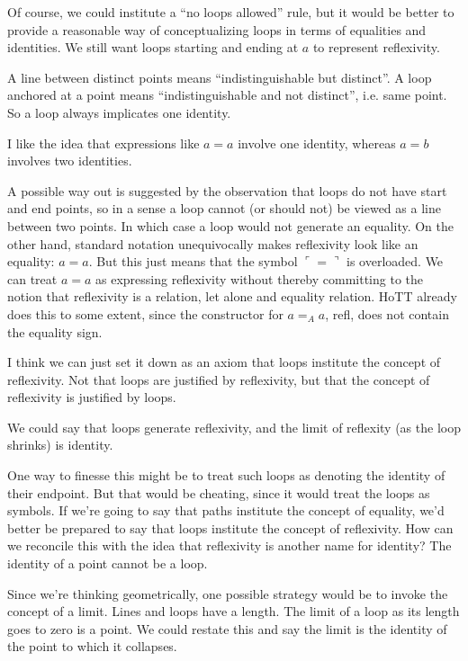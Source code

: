 Of course, we could institute a ``no loops allowed'' rule, but it
would be better to provide a reasonable way of conceptualizing loops
in terms of equalities and identities. We still want loops starting
and ending at \(a\) to represent reflexivity.

A line between distinct points means ``indistinguishable but
distinct''. A loop anchored at a point means ``indistinguishable and
not distinct'', i.e. same point. So a loop always implicates one
identity.

I like the idea that expressions like \(a=a\) involve one identity,
whereas \(a=b\) involves two identities.

A possible way out is suggested by the observation that loops do not
have start and end points, so in a sense a loop cannot (or should not)
be viewed as a line between two points. In which case a loop would not
generate an equality. On the other hand, standard notation
unequivocally makes reflexivity look like an equality: \(a=a\). But
this just means that the symbol \(\ulcorner = \urcorner\) is
overloaded. We can treat \(a=a\) as expressing reflexivity without
thereby committing to the notion that reflexivity is a relation, let
alone and equality relation. HoTT already does this to some extent,
since the constructor for \(a=_A a\), \textsf{refl}, does not contain
the equality sign.

I think we can just set it down as an axiom that loops institute the
concept of reflexivity. Not that loops are justified by reflexivity,
but that the concept of reflexivity is justified by loops.

We could say that loops generate reflexivity, and the limit of
reflexity (as the loop shrinks) is identity.

One way to finesse this might be to treat such loops as denoting the
identity of their endpoint. But that would be cheating, since it would
treat the loops as symbols. If we're going to say that paths institute
the concept of equality, we'd better be prepared to say that loops
institute the concept of reflexivity. How can we reconcile this with
the idea that reflexivity is another name for identity? The identity
of a point cannot be a loop.

Since we're thinking geometrically, one possible strategy would be to
invoke the concept of a limit. Lines and loops have a length. The
limit of a loop as its length goes to zero is a point. We could
restate this and say the limit is the identity of the point to which
it collapses.

